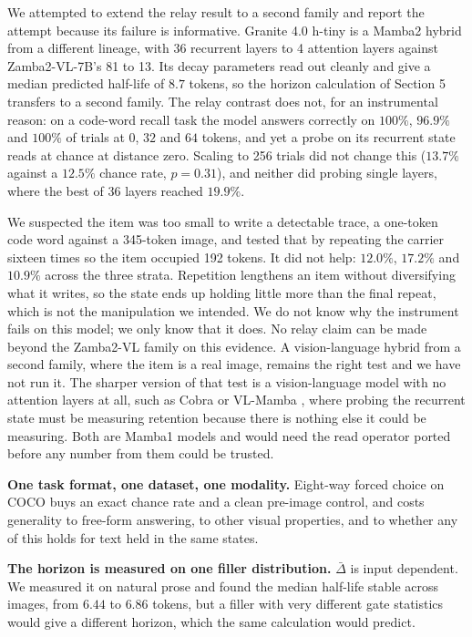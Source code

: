 \documentclass[10pt]{article}
\begin{document}
We attempted to extend the relay result to a second family and report the
attempt because its failure is informative. Granite 4.0 h-tiny \cite{granite4} is a Mamba2
hybrid from a different lineage, with 36 recurrent layers to 4 attention layers
against Zamba2-VL-7B's 81 to 13. Its decay parameters read out cleanly and give
a median predicted half-life of $8.7$ tokens, so the horizon calculation of
Section 5 transfers to a second family. The relay contrast does not, for an
instrumental reason: on a code-word recall task the model answers correctly on
$100\%$, $96.9\%$ and $100\%$ of trials at $0$, $32$ and $64$ tokens, and yet a
probe on its recurrent state reads at chance at distance zero. Scaling to 256
trials did not change this ($13.7\%$ against a $12.5\%$ chance rate,
$p = 0.31$), and neither did probing single layers, where the best of 36 layers
reached $19.9\%$.

We suspected the item was too small to write a detectable trace, a one-token
code word against a 345-token image, and tested that by repeating the carrier
sixteen times so the item occupied 192 tokens. It did not help: $12.0\%$,
$17.2\%$ and $10.9\%$ across the three strata. Repetition lengthens an item
without diversifying what it writes, so the state ends up holding little more
than the final repeat, which is not the manipulation we intended. We do not
know why the instrument fails on this model; we only know that it does. No
relay claim can be made beyond the Zamba2-VL family on this evidence. A
vision-language hybrid from a second family, where the item
is a real image, remains the right test and we have not run it. The sharper
version of that test is a vision-language model with no attention layers at all,
such as Cobra \cite{zhao2025cobra} or VL-Mamba \cite{qiao2024vlmamba}, where
probing the recurrent state must be measuring retention because there is nothing
else it could be measuring. Both are Mamba1 models and would need the read
operator ported before any number from them could be trusted.

\textbf{One task format, one dataset, one modality.} Eight-way forced choice on
COCO buys an exact chance rate and a clean pre-image control, and costs
generality to free-form answering, to other visual properties, and to whether
any of this holds for text held in the same states.

\textbf{The horizon is measured on one filler distribution.} $\bar{\Delta}$ is
input dependent. We measured it on natural prose and found the median half-life
stable across images, from $6.44$ to $6.86$ tokens, but a filler with very
different gate statistics would give a different horizon, which the same
calculation would predict.
\end{document}
